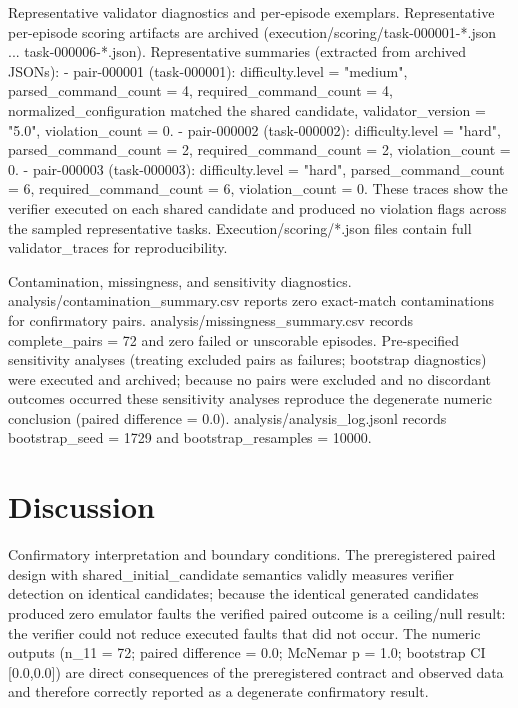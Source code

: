 \documentclass[conference]{IEEEtran}
\begin{document}
Representative validator diagnostics and per-episode exemplars. Representative per-episode scoring artifacts are archived (execution/scoring/task-000001-*.json ... task-000006-*.json). Representative summaries (extracted from archived JSONs):
- pair-000001 (task-000001): difficulty.level = "medium", parsed\_command\_count = 4, required\_command\_count = 4, normalized\_configuration matched the shared candidate, validator\_version = "5.0", violation\_count = 0.
- pair-000002 (task-000002): difficulty.level = "hard", parsed\_command\_count = 2, required\_command\_count = 2, violation\_count = 0.
- pair-000003 (task-000003): difficulty.level = "hard", parsed\_command\_count = 6, required\_command\_count = 6, violation\_count = 0.
These traces show the verifier executed on each shared candidate and produced no violation flags across the sampled representative tasks. Execution/scoring/*.json files contain full validator\_traces for reproducibility.

Contamination, missingness, and sensitivity diagnostics. analysis/contamination\_summary.csv reports zero exact-match contaminations for confirmatory pairs. analysis/missingness\_summary.csv records complete\_pairs = 72 and zero failed or unscorable episodes. Pre-specified sensitivity analyses (treating excluded pairs as failures; bootstrap diagnostics) were executed and archived; because no pairs were excluded and no discordant outcomes occurred these sensitivity analyses reproduce the degenerate numeric conclusion (paired difference = 0.0). analysis/analysis\_log.jsonl records bootstrap\_seed = 1729 and bootstrap\_resamples = 10000.

\section{Discussion}
Confirmatory interpretation and boundary conditions. The preregistered paired design with shared\_initial\_candidate semantics validly measures verifier detection on identical candidates; because the identical generated candidates produced zero emulator faults the verified paired outcome is a ceiling/null result: the verifier could not reduce executed faults that did not occur. The numeric outputs (n\_11 = 72; paired difference = 0.0; McNemar p = 1.0; bootstrap CI [0.0,0.0]) are direct consequences of the preregistered contract and observed data and therefore correctly reported as a degenerate confirmatory result.
\end{document}

